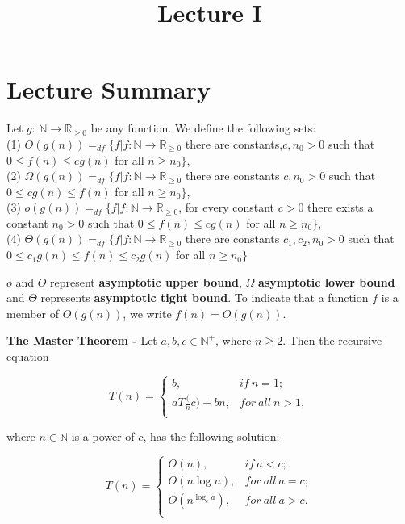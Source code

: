 \documentclass[a4paper]{article}
\title{\vspace{-2cm}Lecture I\vspace{-2cm}}
\date{}
\begin{document}
\maketitle
\section{Lecture Summary}
\begin{definition}
Let $g$: $\mathbb{N} \to \mathbb{R}_{\geq 0}$ be any function. We define the following sets:\\
(1) $O(g(n)) =_{df} \{f | f : \mathbb{N} \to \mathbb{R}_{\geq 0}$ there are constants,$c, n_{0} > 0$ such that $0 \leq f(n) \leq cg(n)$ for all $n \geq n_{0} \}$,\\
(2) $\Omega(g(n)) =_{df} \{f | f : \mathbb{N} \to \mathbb{R}_{\geq 0}$ there are constants $c, n_{0} > 0$ such that $0 \leq cg(n) \leq f(n)$ for all $n \geq n_{0} \}$,\\
(3) $o(g(n)) =_{df} \{f | f : \mathbb{N} \to \mathbb{R}_{\geq 0}$, for every constant $c > 0$ there exists a constant $n_{0} > 0$ such that $0 \leq f(n) \leq cg(n)$ for all $n \geq n_{0} \}$,\\
(4) $\Theta(g(n)) =_{df} \{f | f : \mathbb{N} \to \mathbb{R}_{\geq 0}$ there are constants $c_{1}, c_{2}, n_{0} > 0$ such that $0 \leq c_{1}g(n) \leq f(n) \leq c_{2}g(n)$ for all $n \geq n_{0} \}$
\end{definition}
$o$ and $O$ represent \textbf{asymptotic upper bound}, $\Omega$ \textbf{asymptotic lower bound} and $\Theta$ represents \textbf{asymptotic tight bound}. To indicate that a function $f$ is a member of $O(g(n))$, we write $f(n) = O(g(n))$.


\begin{theorem}
\textbf{The Master Theorem -} Let $a, b, c \in \mathbb{N}^{+}$, where $n \geq 2$. Then the recursive equation
\begin{center}
\[ 
T(n)=\left\{
\begin{array}{ll}
      b, & if\ n=1; \\
      aT\frac({n}{c})+bn, & for\ all\ n > 1,\\
\end{array} 
\right. 
\]
\end{center}
where $n \in \mathbb{N}$ is a power of $c$, has the following solution:
\begin{center}
\[ 
T(n)=\left\{
\begin{array}{ll}
      O(n), & if\ a < c; \\
      O(n \log{n}), & for\ all\ a=c;\\
      O(n^{\log_{c}{a}}), & for\ all\ a > c. \\
\end{array} 
\right. 
\]
\end{center}
\end{theorem}
\end{document}
